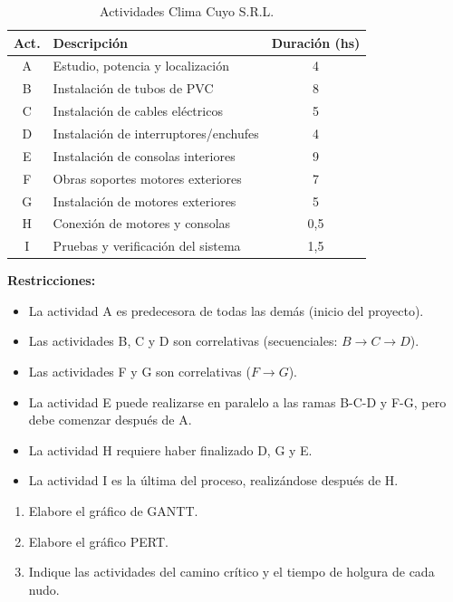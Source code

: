 \documentclass[../main]{subfiles}
\begin{document}
\begin{enumerate}
    \begin{table}[h!]
      \centering
      \begin{tabular}{|c|l|c|} \hline
        \textbf{Act.} & \textbf{Descripción} & \textbf{Duración (hs)}
        \\ \hline \hline
        A & Estudio, potencia y localización & 4 \\
        B & Instalación de tubos de PVC & 8 \\
        C & Instalación de cables eléctricos & 5 \\
        D & Instalación de interruptores/enchufes & 4 \\
        E & Instalación de consolas interiores & 9 \\
        F & Obras soportes motores exteriores & 7 \\
        G & Instalación de motores exteriores & 5 \\
        H & Conexión de motores y consolas & 0,5 \\
        I & Pruebas y verificación del sistema & 1,5 \\ \hline
      \end{tabular}
      \caption{Actividades Clima Cuyo S.R.L.}
      \label{tab:clima_cuyo}
    \end{table}

    \textbf{Restricciones:}
    \begin{itemize}
      \item La actividad A es predecesora de todas las demás (inicio
        del proyecto).
      \item Las actividades B, C y D son correlativas (secuenciales:
        $B \rightarrow C \rightarrow D$).
      \item Las actividades F y G son correlativas ($F \rightarrow G$).
      \item La actividad E puede realizarse en paralelo a las ramas
        B-C-D y F-G, pero debe comenzar después de A.
      \item La actividad H requiere haber finalizado D, G y E.
      \item La actividad I es la última del proceso, realizándose después de H.
    \end{itemize}

    \begin{enumerate}
      \item Elabore el gráfico de GANTT.
      \item Elabore el gráfico PERT.
      \item Indique las actividades del camino crítico y el tiempo de
        holgura de cada nudo.
    \end{enumerate}


\end{enumerate}
\end{document}
